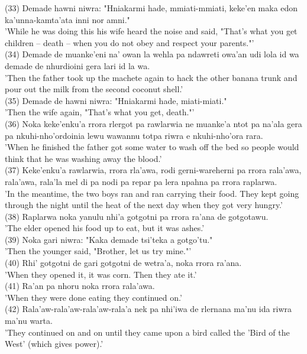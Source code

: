 \documentclass[10pt]{article}
\begin{document}
(33) Demade hawni niwra: "Hniakarmi hade, mmiati-mmiati, keke'en maka edon ka'unna-kamta'ata inni nor amni."\\
'While he was doing this his wife heard the noise and said, "That's what you get children -- death -- when you do not obey and respect your parents."'\\
(34) Demade de muanke'eni na' owan la wehla pa ndawreti owa'an udi lola id wa demade de nhurdioini gera lari id la wa.\\
'Then the father took up the machete again to hack the other banana trunk and pour out the milk from the second coconut shell.'\\
(35) Demade de hawni niwra: "Hniakarmi hade, miati-miati."\\
'Then the wife again, "That's what you get, death."'\\
(36) Noka keke'enku'a rrora rlergot pa rawlarwia ne muanke'a ntot pa na'ala gera pa nkuhi-nho'ordoinia lewu wawannu totpa riwra e nkuhi-nho'ora rara.\\
'When he finished the father got some water to wash off the bed so people would think that he was washing away the blood.'\\
(37) Keke'enku'a rawlarwia, rrora rla'awa, rodi gerni-wareherni pa rrora rala'awa, rala'awa, rala'la mel di pa nodi pa repar pa lera npahna pa rrora raplarwa.\\
'In the meantime, the two boys ran and ran carrying their food. They kept going through the night until the heat of the next day when they got very hungry.'\\
(38) Raplarwa noka yanulu nhi'a gotgotni pa rrora ra'ana de gotgotawu.\\
'The elder opened his food up to eat, but it was ashes.'\\
(39) Noka gari niwra: "Kaka demade tsi'teka a gotgo'tu."\\
'Then the younger said, "Brother, let us try mine."'\\
(40) Rhi' gotgotni de gari gotgotni de wetra'a, noka rrora ra'ana.\\
'When they opened it, it was corn. Then they ate it.'\\
(41) Ra'an pa nhoru noka rrora rala'awa.\\
'When they were done eating they continued on.'\\
(42) Rala'aw-rala'aw-rala'aw-rala'a nek pa nhi'iwa de rlernana ma'nu ida riwra ma'nu warta.\\
'They continued on and on until they came upon a bird called the 'Bird of the West' (which gives power).'\\
\end{document}

